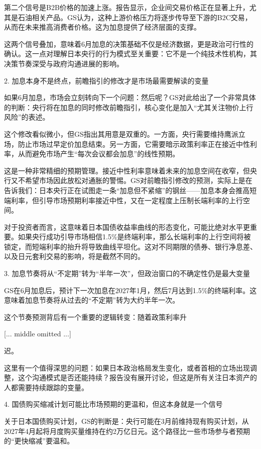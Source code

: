 \documentclass[11pt]{ctexart}
\begin{document}
第二个信号是B2B价格的加速上涨。报告显示，企业间交易价格正在显著上升，尤其是石油相关产品。GS认为，这种上游价格压力将逐步传导至下游的B2C交易，从而在未来推高消费者价格。这为加息提供了经济层面的支撑。

这两个信号叠加，意味着6月加息的决策基础不仅是经济数据，更是政治可行性的确认。这一点对理解日本央行的行为模式至关重要：它不是一个纯技术性机构，其决策节奏深受与政府沟通进展的影响。

2. 加息本身不是终点，前瞻指引的修改才是市场最需要解读的变量

如果6月加息，市场会立刻转向下一个问题：然后呢？GS对此给出了一个非常具体的判断：央行将在加息的同时修改前瞻指引，核心变化是加入“尤其关注物价上行风险”的表述。

这个修改看似微小，但GS指出其用意是双重的。一方面，央行需要维持鹰派立场，防止市场过早定价加息结束。另一方面，它需要暗示政策利率正在接近中性利率，从而避免市场产生“每次会议都会加息”的线性预期。

这是一种非常精细的预期管理。接近中性利率意味着未来的加息空间在收窄，但央行又不希望市场因此放松对通胀的警惕。GS对前瞻指引修改的预测，实际上是在告诉我们：日本央行正在试图走一条“加息但不紧缩”的钢丝——加息本身会推高短端利率，但引导市场预期利率接近中性，又在一定程度上压制长端利率的上行空间。

对于投资者而言，这意味着日本国债收益率曲线的形态变化，可能比绝对水平更重要。如果央行成功引导市场相信1.5\%是终端利率，那么长端利率的上行空间将被锁定，而短端利率的抬升将导致曲线平坦化。这对不同期限的债券、银行净息差、以及日元套利交易的影响，将是截然不同的。

3. 加息节奏将从“不定期”转为“半年一次”，但政治窗口的不确定性仍是最大变量

GS在6月加息后，预计下一次加息在2027年1月，然后7月达到1.5\%的终端利率。这意味着加息节奏将从过去的“不定期”转为大约半年一次。

这个节奏预测背后有一个重要的逻辑转变：随着政策利率升

[... middle omitted ...]

迟。

这里有一个值得深思的问题：如果日本政治格局发生变化，或者首相的立场出现调整，这个沟通模式是否还能持续？报告没有展开讨论，但这是所有关注日本资产的人都需要持续跟踪的变量。

4. 国债购买缩减计划可能比市场预期的更温和，但这本身就是一个信号

关于日本国债购买计划，GS的判断是：央行可能在3月前维持现有购买计划，从2027年4月起将月度购买量维持在约2万亿日元。这个路径比一些市场参与者预期的“更快缩减”要温和。
\end{document}
